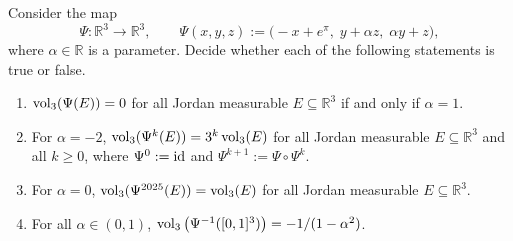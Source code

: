 \begin{exercise}
\label{ex:examHS24_TF_affine_volume_scaling}
Consider the map
\[\Psi : \mathbb{R}^3 \to \mathbb{R}^3, \qquad
  \Psi(x,y,z) := \big(-x + e^\pi,\; y + \alpha z,\; \alpha y + z\big),\]
where $\alpha \in \mathbb{R}$ is a parameter. Decide whether each of the following statements is
true or false.
\begin{enumerate}[label=\textbf{(\alph*)}]
  \item $\operatorname{vol}_3(\Psi(E)) = 0$ for all Jordan measurable $E \subseteq \mathbb{R}^3$ if and only if
    $\alpha = 1$.
  \item For $\alpha = -2$, $\operatorname{vol}_3(\Psi^k(E)) = 3^k \operatorname{vol}_3(E)$ for all Jordan measurable
    $E \subseteq \mathbb{R}^3$ and all $k \ge 0$, where $\Psi^0 := \operatorname{id}$ and
    $\Psi^{k+1} := \Psi \circ \Psi^k$.
  \item For $\alpha = 0$, $\operatorname{vol}_3(\Psi^{2025}(E)) = \operatorname{vol}_3(E)$ for all Jordan measurable
    $E \subseteq \mathbb{R}^3$.
  \item For all $\alpha \in (0,1)$, $\operatorname{vol}_3\big(\Psi^{-1}([0,1]^3)\big) = -1/(1-\alpha^2)$.
\end{enumerate}
\end{exercise}


